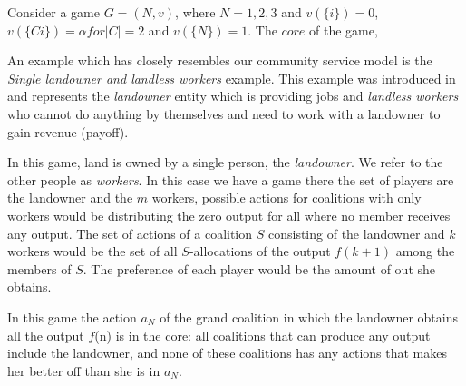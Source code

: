             
            \begin{example}\label{ex:simplecorealpha}
                Consider a game $G = (N, v)$,  where $N = {1,2,3}$ and $v(\{i\}) = 0$, $v(\{Ci\}) = \alpha for |C| = 2$ and $v(\{N\}) = 1$. The $core$ of the game, 
            \end{example}

            \begin{example}\label{ex:simplecore2}

                An example which has closely resembles our community service model is the \emph{Single landowner and landless workers} example.
                This example was introduced in \cite{GVK369342747} and represents the \emph{landowner} entity which is providing jobs and \emph{landless workers} who cannot do anything by themselves and need to work with a landowner to gain revenue (payoff).

                In this game, land is owned by a single person, the \emph{landowner}. We refer to the other people as \emph{workers}. In this case we have a game there the set of players are the landowner and the $m$ workers, possible actions for coalitions with only workers would be distributing the zero output for all where no member receives any output. The set of actions of a coalition $S$ consisting of the landowner and $k$ workers would be the set of all $S$-allocations of the output $f(k+1)$ among the members of $S$. The preference of each player would be the amount of out she obtains.

                In this game the action $a_{N}$ of the grand coalition in which the landowner obtains all the output $f$(n)
                is in the core: all coalitions that can produce any output include the landowner, and none of these
                coalitions has any actions that makes her better off than she is in $a_{N}$.


\end{example}
